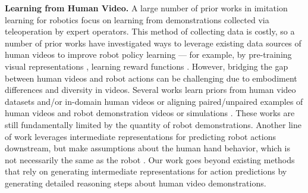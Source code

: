 \noindent \textbf{Learning from Human Video.}
A large number of prior works in imitation learning for robotics focus on learning from demonstrations collected via teleoperation by expert operators.
This method of collecting data is costly, so a number of prior works have investigated ways to leverage existing data sources of human videos to improve robot policy learning --- for example, by pre-training visual representations \citep{nair2022r3m, xiao2022masked, karamcheti2023language},  learning reward functions \citep{shao2021concept2robot, chen2021learning, mandikal2022dexvip}.
However, bridging the gap between human videos and robot actions can be challenging due to embodiment differences and diversity in videos. Several works learn priors from human video datasets and/or in-domain human videos \citep{shaw2023videodex, bahl2022human, wang2023mimicplay, lepertshadow} or aligning paired/unpaired examples of human videos and robot demonstration videos \citep{sharma2019third, smith2019avid, xiong2021learning, jain2024vid2robot} or simulations \citep{qin2022dexmv}. These works are still fundamentally limited by the quantity of robot demonstrations. Another line of work leverages intermediate representations for predicting robot actions downstream, but make assumptions about the human hand behavior, which is not necessarily the same as the robot \cite{papagiannis2024r+, bharadhwaj2024track2act}. Our work goes beyond existing methods that rely on generating intermediate representations for action predictions by generating detailed reasoning steps about human video demonstrations.

